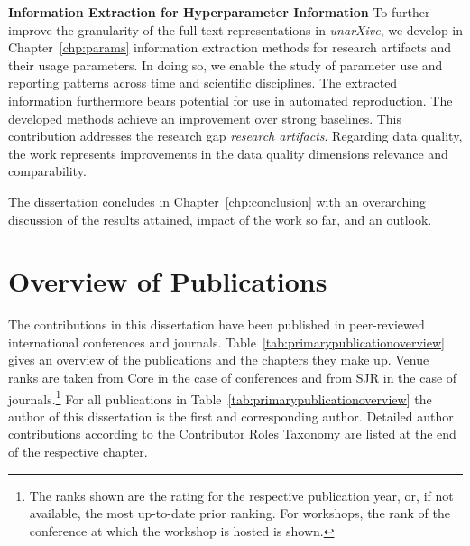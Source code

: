 \textbf{Information Extraction for Hyperparameter Information} To further improve the granularity of the full-text representations in \emph{unarXive}, we develop in Chapter~\ref{chp:params} information extraction methods for research artifacts and their usage parameters. In doing so, we enable the study of parameter use and reporting patterns across time and scientific disciplines. The extracted information furthermore bears potential for use in automated reproduction. The developed methods achieve an improvement over strong baselines.
This contribution addresses the research gap \emph{research artifacts}.
Regarding data quality, the work represents improvements %
in the data quality dimensions relevance and comparability.

The dissertation concludes in Chapter~\ref{chp:conclusion} with an overarching discussion of the results attained, impact of the work so far, and an outlook.

\section{Overview of Publications}

The contributions in this dissertation have been published in peer-reviewed international conferences and journals. Table~\ref{tab:primarypublicationoverview} gives an overview of the publications and the chapters they make up. Venue ranks are taken from Core in the case of conferences and from SJR in the case of journals.\footnote{The ranks shown are the rating for the respective publication year, or, if not available, the most up-to-date prior ranking. For workshops, the rank of the conference at which the workshop is hosted is shown.} For all publications in Table~\ref{tab:primarypublicationoverview} the author of this dissertation is the first and corresponding author. Detailed author contributions according to the Contributor Roles Taxonomy are listed at the end of the respective chapter.

